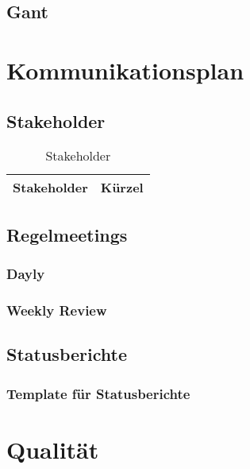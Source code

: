 \subsection{Gant} %

\section{Kommunikationsplan}
\subsection{Stakeholder}
\begin{table}[H]
    \renewcommand{\arraystretch}{1.1}
    \begin{center}
        \begin{tabular}{l|l}
            \textbf{Stakeholder} & \textbf{Kürzel}\\\hline
            
            
            
            
        \end{tabular}
    \end{center}
    \caption{Stakeholder}
\end{table}
\subsection{Regelmeetings} %


\subsubsection{Dayly}


\subsubsection{Weekly Review}


\subsection{Statusberichte} %


\subsubsection{Template für Statusberichte}



\section{Qualität}
